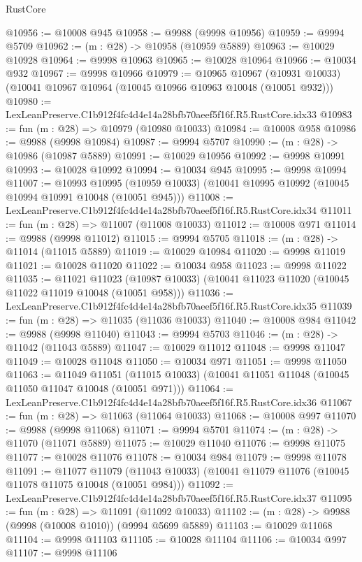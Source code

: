 \begin{lexlean}{RustCore}
\begin{coremodule}
@10956 := @10008 @945
@10958 := @9988 (@9998 @10956)
@10959 := @9994 @5709
@10962 := (m : @28) -> @10958 (@10959 @5889)
@10963 := @10029 @10928
@10964 := @9998 @10963
@10965 := @10028 @10964
@10966 := @10034 @932
@10967 := @9998 @10966
@10979 := @10965
    @10967
    (@10931 @10033)
    (@10041 @10967 @10964 (@10045 @10966 @10963 @10048 (@10051 @932)))
@10980 := LexLeanPreserve.C1b912f4fc4d4e14a28bfb70aeef5f16f.R5.RustCore.idx33
@10983 := fun (m : @28) => @10979 (@10980 @10033)
@10984 := @10008 @958
@10986 := @9988 (@9998 @10984)
@10987 := @9994 @5707
@10990 := (m : @28) -> @10986 (@10987 @5889)
@10991 := @10029 @10956
@10992 := @9998 @10991
@10993 := @10028 @10992
@10994 := @10034 @945
@10995 := @9998 @10994
@11007 := @10993
    @10995
    (@10959 @10033)
    (@10041 @10995 @10992 (@10045 @10994 @10991 @10048 (@10051 @945)))
@11008 := LexLeanPreserve.C1b912f4fc4d4e14a28bfb70aeef5f16f.R5.RustCore.idx34
@11011 := fun (m : @28) => @11007 (@11008 @10033)
@11012 := @10008 @971
@11014 := @9988 (@9998 @11012)
@11015 := @9994 @5705
@11018 := (m : @28) -> @11014 (@11015 @5889)
@11019 := @10029 @10984
@11020 := @9998 @11019
@11021 := @10028 @11020
@11022 := @10034 @958
@11023 := @9998 @11022
@11035 := @11021
    @11023
    (@10987 @10033)
    (@10041 @11023 @11020 (@10045 @11022 @11019 @10048 (@10051 @958)))
@11036 := LexLeanPreserve.C1b912f4fc4d4e14a28bfb70aeef5f16f.R5.RustCore.idx35
@11039 := fun (m : @28) => @11035 (@11036 @10033)
@11040 := @10008 @984
@11042 := @9988 (@9998 @11040)
@11043 := @9994 @5703
@11046 := (m : @28) -> @11042 (@11043 @5889)
@11047 := @10029 @11012
@11048 := @9998 @11047
@11049 := @10028 @11048
@11050 := @10034 @971
@11051 := @9998 @11050
@11063 := @11049
    @11051
    (@11015 @10033)
    (@10041 @11051 @11048 (@10045 @11050 @11047 @10048 (@10051 @971)))
@11064 := LexLeanPreserve.C1b912f4fc4d4e14a28bfb70aeef5f16f.R5.RustCore.idx36
@11067 := fun (m : @28) => @11063 (@11064 @10033)
@11068 := @10008 @997
@11070 := @9988 (@9998 @11068)
@11071 := @9994 @5701
@11074 := (m : @28) -> @11070 (@11071 @5889)
@11075 := @10029 @11040
@11076 := @9998 @11075
@11077 := @10028 @11076
@11078 := @10034 @984
@11079 := @9998 @11078
@11091 := @11077
    @11079
    (@11043 @10033)
    (@10041 @11079 @11076 (@10045 @11078 @11075 @10048 (@10051 @984)))
@11092 := LexLeanPreserve.C1b912f4fc4d4e14a28bfb70aeef5f16f.R5.RustCore.idx37
@11095 := fun (m : @28) => @11091 (@11092 @10033)
@11102 := (m : @28) -> @9988 (@9998 (@10008 @1010)) (@9994 @5699 @5889)
@11103 := @10029 @11068
@11104 := @9998 @11103
@11105 := @10028 @11104
@11106 := @10034 @997
@11107 := @9998 @11106

\end{coremodule}
\end{lexlean}
